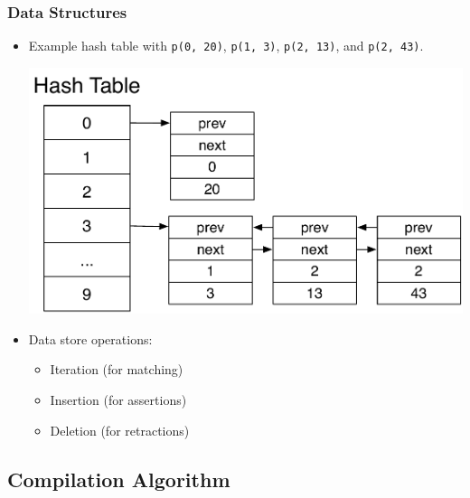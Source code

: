 \documentclass{beamer}
\begin{document}
\begin{frame}[fragile]
   \frametitle{Data Structures}
   \begin{itemize}
      \item Example hash table with \texttt{p(0, 20)}, \texttt{p(1, 3)},
         \texttt{p(2, 13)}, and \texttt{p(2, 43)}.
      \begin{center}
        \includegraphics[width=0.7\linewidth]{hash_table.pdf}
      \end{center}
      \item Data store operations:
      \begin{itemize}
         \item Iteration (for matching)
         \item Insertion (for assertions)
         \item Deletion (for retractions)
      \end{itemize}
   \end{itemize}
\end{frame}

\subsection{Compilation Algorithm}
\end{document}
